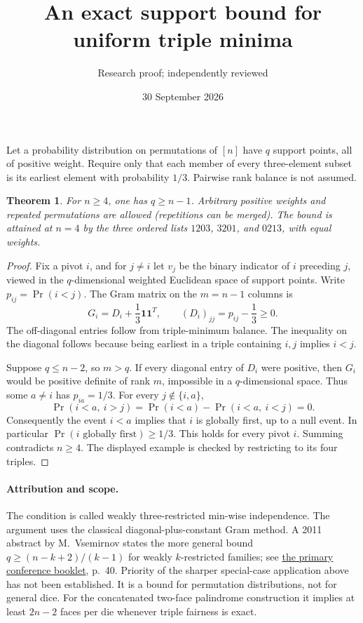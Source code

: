 \documentclass[11pt]{article}
\title{An exact support bound for uniform triple minima}
\author{Research proof; independently reviewed}
\date{30 September 2026}
\newtheorem{theorem}{Theorem}
\begin{document}
\maketitle
Let a probability distribution on permutations of $[n]$ have $q$ support
points, all of positive weight. Require only that each member of every
three-element subset is its earliest element with probability $1/3$.
Pairwise rank balance is not assumed.
\begin{theorem}
For $n\ge4$, one has $q\ge n-1$. Arbitrary positive weights and repeated
permutations are allowed (repetitions can be merged).
The bound is attained at $n=4$ by the three ordered lists
$1203$, $3201$, and $0213$, with equal weights.
\end{theorem}
\begin{proof}
Fix a pivot $i$, and for $j\ne i$ let $v_j$ be the binary indicator of
$i$ preceding $j$, viewed in the $q$-dimensional weighted Euclidean
space of support points. Write $p_{ij}=\Pr(i<j)$.
The Gram matrix on the $m=n-1$ columns is
\[
 G_i=D_i+\frac13\mathbf1\mathbf1^T,\qquad
 (D_i)_{jj}=p_{ij}-\frac13\ge0.
\]
The off-diagonal entries follow from triple-minimum balance. The
inequality on the diagonal follows because being earliest in a triple
containing $i,j$ implies $i<j$.

Suppose $q\le n-2$, so $m>q$. If every diagonal entry of $D_i$ were
positive, then $G_i$ would be positive definite of rank $m$, impossible
in a $q$-dimensional space. Thus some $a\ne i$ has $p_{ia}=1/3$.
For every $j\notin\{i,a\}$,
\[
 \Pr(i<a,\ i>j)=\Pr(i<a)-\Pr(i<a,\ i<j)=0.
\]
Consequently the event $i<a$ implies that $i$ is globally first, up to
a null event. In particular $\Pr(i\text{ globally first})\ge1/3$.
This holds for every pivot $i$. Summing contradicts $n\ge4$.
The displayed example is checked by restricting to its four triples.
\end{proof}

\paragraph{Attribution and scope.}
The condition is called weakly three-restricted min-wise independence.
The argument uses the classical diagonal-plus-constant Gram method.
A 2011 abstract by M.~Vsemirnov states the more general bound
$q\ge(n-k+2)/(k-1)$ for weakly $k$-restricted families; see
\href{https://www.pdmi.ras.ru/EIMI/2011/RuFiDiM/booklet.pdf}{the primary conference booklet},
p.~40. Priority of the sharper special-case application above has not
been established. It is a bound for permutation distributions, not for
general dice. For the concatenated two-face palindrome construction it
implies at least $2n-2$ faces per die whenever triple fairness is exact.
\end{document}
